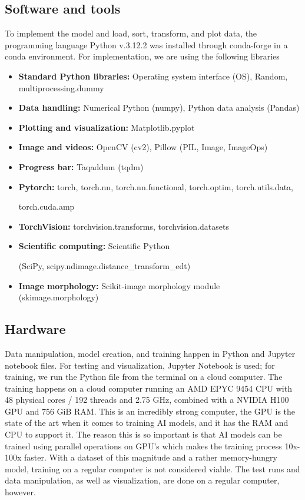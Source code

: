 \documentclass[a4paper,12pt]{article}
\begin{document}
\subsection{Software and tools}
To implement the model and load, sort, transform, and plot data, the programming language Python v.3.12.2 was installed through conda-forge in a conda environment.
For implementation, we are using the following libraries
\begin{itemize}
 \item \textbf{Standard Python libraries:} Operating system interface (OS), Random, multiprocessing.dummy
 \item \textbf{Data handling:} Numerical Python (numpy), Python data analysis (Pandas)
 \item \textbf{Plotting and visualization:} Matplotlib.pyplot
 \item \textbf{Image and videos:} OpenCV (cv2), Pillow (PIL, Image, ImageOps)
 \item \textbf{Progress bar:} Taqaddum (tqdm)
 \item \textbf{Pytorch:} torch, torch.nn, torch.nn.functional, torch.optim, torch.utils.data,
 
  torch.cuda.amp
 \item \textbf{TorchVision:} torchvision.transforms, torchvision.datasets
 \item \textbf{Scientific computing:} Scientific Python
  
 (SciPy, scipy.ndimage.distance\_transform\_edt)
 \item \textbf{Image morphology:} Scikit-image morphology module (skimage.morphology)
\end{itemize}


\subsection{Hardware}
Data manipulation, model creation, and training happen in Python and Jupyter notebook files. For testing and visualization, Jupyter Notebook is used; for training, we run the Python file from the terminal on a cloud computer.
The training happens on a cloud computer running an AMD EPYC 9454 CPU with 48 physical cores / 192 threads and 2.75 GHz, combined with a NVIDIA H100 GPU and 756 GiB RAM. This is an incredibly strong computer, the GPU is the state of the art when it comes to training AI models, and it has the RAM and CPU to support it. The reason this is so important is that AI models can be trained using parallel operations on GPU's which makes the training process 10x-100x faster.
With a dataset of this magnitude and a rather memory-hungry model, training on a regular computer is not considered viable. The test runs and data manipulation, as well as visualization, are done on a regular computer, however.
\end{document}
